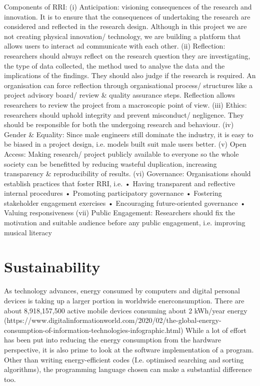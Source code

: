 Components of RRI:
(i)	Anticipation: visioning consequences of the research and innovation. It is to ensure that the consequences of undertaking the research are considered and reflected in the research design. Although in this project we are not creating physical innovation/ technology, we are building a platform that allows users to interact ad communicate with each other.
(ii)	Reflection: researchers should always reflect on the research question they are investigating, the type of data collected, the method used to analyse the data and the implications of the findings. They should also judge if the research is required. An organisation can force reflection through organisational process/ structures like a project advisory board/ review & quality assurance steps. Reflection allows researchers to review the project from a macroscopic point of view.
(iii)	Ethics: researchers should uphold integrity and prevent misconduct/ negligence. They should be responsible for both the undergoing research and behaviour.
(iv)	Gender & Equality: Since male engineers still dominate the industry, it is easy to be biased in a project design, i.e. models built suit male users better.
(v)	Open Access: Making research/ project publicly available to everyone so the whole society can be benefitted by reducing wasteful duplication, increasing transparency & reproducibility of results.
(vi)	Governance: Organisations should establish practices that foster RRI, i.e. 
•	Having transparent and reflective internal procedures
•	Promoting participatory governance
•	Fostering stakeholder engagement exercises
•	Encouraging future-oriented governance
•	Valuing responsiveness
(vii)	Public Engagement: Researchers should fix the motivation and suitable audience before any public engagement, i.e. improving musical literacy

\section{Sustainability}
As technology advances, energy consumed by computers and digital personal devices is taking up a larger portion in worldwide enerconsumption. There are about 8,918,157,500 active mobile devices consuming about 2 kWh/year energy (https://www.digitalinformationworld.com/2020/02/the-global-energy-consumption-of-information-technologies-infographic.html)
While a lot of effort has been put into reducing the energy consumption from the hardware perspective, it is also prime to look at the software implementation of a program. Other than writing energy-efficient codes (I.e. optimised searching and sorting algorithms), the programming language chosen can make a substantial difference too.

